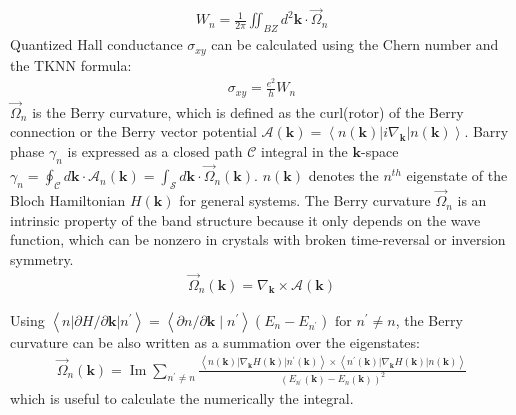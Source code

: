 \begin{align}
	W_{n}=\frac{1}{2 \pi} \iint_{B Z} d ^{2} \boldsymbol{k} \cdot \vec{\Omega}_{n}
\end{align}
Quantized Hall conductance $\sigma_{xy}$ can be calculated using the Chern number and the TKNN formula\cite{thouless1982quantized}:
\begin{align}
	\sigma_{xy}=\frac{e^2}{h}W_n
\end{align}
$\vec{\Omega}_n$ is the Berry curvature, which is defined as the curl(rotor) of the Berry connection or the
Berry vector potential $\mathcal{A}(\boldsymbol{k})=\left\langle n(\boldsymbol{k})\left|i \nabla_{\boldsymbol{k}}\right|n(\boldsymbol{k})\right\rangle
$\cite{berry1984quantal}. Barry phase $\gamma_n$ is expressed as a closed path $\mathcal{C}$ integral in the $\boldsymbol{k}$-space $\gamma_{n}=\oint_{\mathcal{C}} d \boldsymbol{k} \cdot \mathcal{A}_{n}(\boldsymbol{k})=\int_{\mathcal{S}} d \boldsymbol{k} \cdot \vec{\Omega}_{n}(\boldsymbol{k})$.
$n(\boldsymbol{k})$ denotes the $n^{th}$ eigenstate of the Bloch
Hamiltonian $H(\boldsymbol{k})$ for general systems. The Berry curvature $\vec{\Omega}_n$ is an intrinsic property of the
band structure because it only depends on the wave
function, which can be nonzero in crystals with broken time-reversal or inversion symmetry.\cite{xiao2010berry}
\begin{align}
	\vec{\Omega}_{n}(\boldsymbol{k})=\nabla_{\boldsymbol{k}} \times\mathcal{A}(\boldsymbol{k})
\end{align}

Using $\left\langle n|\partial H / \partial \boldsymbol{k}| n^{\prime}\right\rangle=\left\langle\partial n / \partial \boldsymbol{k} \mid n^{\prime}\right\rangle\left(E_{n}-E_{n^{\prime}}\right) \text { for } n^{\prime} \neq n$, the Berry curvature can be also written as a summation over the eigenstates:
\begin{align}
	\vec{\Omega}_{n}(\boldsymbol{k})=\operatorname{Im} \sum_{n^\prime \neq n} \frac{\left\langle n(\boldsymbol{k})\left|\nabla_{\boldsymbol{k}} H(\boldsymbol{k})\right| n^\prime(\boldsymbol{k})\right\rangle \times\left\langle n^\prime(\boldsymbol{k})\left|\nabla_{\boldsymbol{k}} H(\boldsymbol{k})\right| n(\boldsymbol{k})\right\rangle}{\left(E_{n^\prime}(\boldsymbol{k})-E_{n}(\boldsymbol{k})\right)^{2}}
\end{align}
which is useful to calculate the numerically the integral.\\


